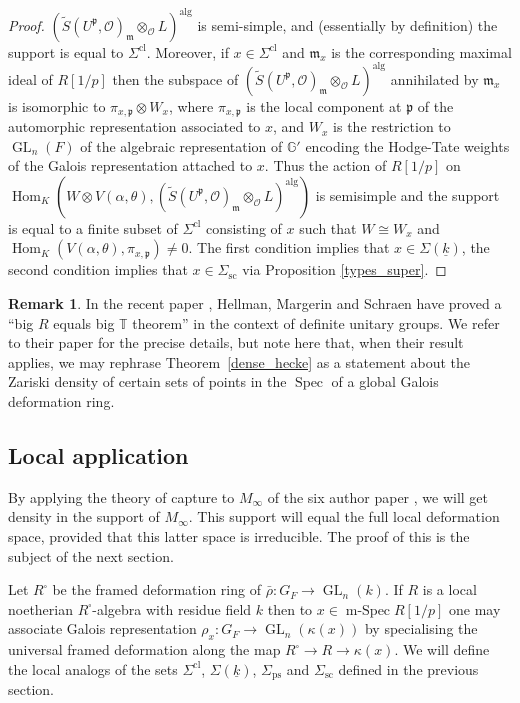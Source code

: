 \documentclass[11pt]{article}
\let\mathcal\mathscr
\newcommand{\ssquare}{{\scriptscriptstyle\square}}
\newcommand{\rps}{\mathrm{ps}}
\newcommand{\rsc}{\mathrm{sc}}
\theoremstyle{definition}
\newtheorem{remark}[prop]{Remark}
\DeclareMathOperator{\Hom}{Hom}
\DeclareMathOperator{\GL}{GL}
\DeclareMathOperator{\Spec}{Spec}
\DeclareMathOperator{\mSpec}{m-Spec}
\newcommand{\mm}{\mathfrak m}
\newcommand{\cO}{\mathcal{O}}
\newcommand{\TT}{\mathbb T}
\newcommand{\pp}{\mathfrak p}
\newcommand{\alg}{\mathrm{alg}}
\newcommand{\rhobar}{\bar{\rho}}
\begin{document}
\begin{proof}
$(\tilde{S}(U^{\pp}, \cO)_{\mm}\otimes_{\cO} L)^\alg$ is semi-simple, and (essentially by definition) the support is equal to $\Sigma^{\mathrm{cl}}$.
Moreover, if $x\in \Sigma^{\mathrm{cl}}$ and $\mm_x$ is the corresponding maximal ideal of $R[1/p]$ then the subspace of $(\tilde{S}(U^{\pp}, \cO)_{\mm}\otimes_{\cO} L)^\alg$ annihilated by $\mm_x$ is isomorphic to $\pi_{x,\pp} \otimes W_x$, where
$\pi_{x,\pp}$ is the local component at $\pp$ of the automorphic representation associated to $x$, and $W_x$ is the restriction to $\GL_n(F)$ of the algebraic representation of $\mathbb{G}'$ encoding the Hodge-Tate weights of the Galois
representation attached to $x$. Thus the action of $R[1/p]$ on
$\Hom_K( W\otimes V(\alpha, \theta), (\tilde{S}(U^{\pp}, \cO)_{\mm}\otimes_{\cO} L)^\alg)$ is semisimple and the support is equal to a finite subset of $\Sigma^{\mathrm{cl}}$ consisting of $x$ such that $W\cong W_x$ and
$\Hom_K(V(\alpha, \theta), \pi_{x, \pp})\neq 0$. The first condition implies that
$x\in \Sigma(\underline{k})$, the second condition implies that $x\in \Sigma_{\rsc}$ via Proposition \ref{types_super}.
\end{proof}

\begin{remark}
In the recent paper \cite{HMS}, Hellman, Margerin and Schraen have proved
a ``big $R$ equals big $\TT$ theorem'' in the context of definite unitary groups.
We refer to their paper for the precise details, but note here that, when their
result applies, we may rephrase Theorem~\ref{dense_hecke} as a statement
about the Zariski density of certain sets of points in the $\Spec$
of a global Galois deformation ring.
\end{remark}

\subsection{Local application}
By applying the theory of capture to $M_{\infty}$
of the six author paper \cite{six-authors}, we will get density in the support
of $M_{\infty}$. This support will equal the full local
deformation space, provided that this latter space is irreducible.
The proof of this is the subject of the next section.

Let $R^\ssquare$ be the framed deformation ring of $\rhobar: G_F \to \GL_n(k)$. If $R$ is a local noetherian $R^\ssquare$-algebra
with residue field $k$
then to $x\in \mSpec R[1/p]$ one may associate Galois representation $\rho_x: G_F\to \GL_n(\kappa(x))$ by specialising the universal framed deformation along the map $R^\ssquare\to R\to \kappa(x)$. We will define the local analogs of the sets $\Sigma^{\mathrm{cl}}$,
$\Sigma(\underline{k})$, $\Sigma_{\rps}$ and $\Sigma_{\rsc}$ defined in the previous section.
\end{document}
